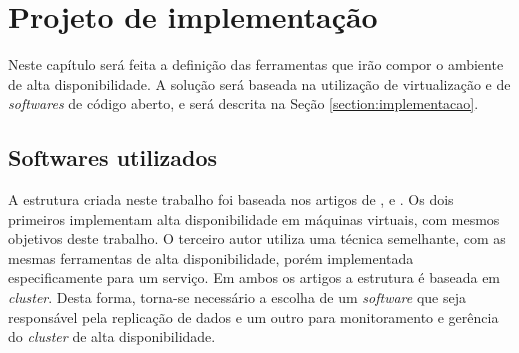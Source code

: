 \chapter{Projeto de implementação}
\label{cap:projetoimplementacao}

Neste capítulo será feita a definição das ferramentas que irão compor o ambiente de alta disponibilidade. A solução será baseada na utilização 
de virtualização e de \textit{softwares} de código aberto, e será descrita na Seção \ref{section:implementacao}.

\section{Softwares utilizados}
\label{section:propostasolucao}




A estrutura criada neste trabalho foi baseada nos artigos de \citet{goncalves2009}, \citet{reis2009} e \citet{zaminhani2008}. 
Os dois primeiros implementam alta disponibilidade em máquinas virtuais, com mesmos objetivos deste trabalho. O terceiro autor utiliza uma 
técnica semelhante, com as mesmas ferramentas de alta disponibilidade, porém implementada especificamente para um serviço.
Em ambos os artigos a estrutura é baseada em \textit{cluster}. Desta forma, torna-se necessário a escolha de um \textit{software} que seja 
responsável pela replicação de dados e um outro para monitoramento e gerência do \textit{cluster} de alta disponibilidade.


